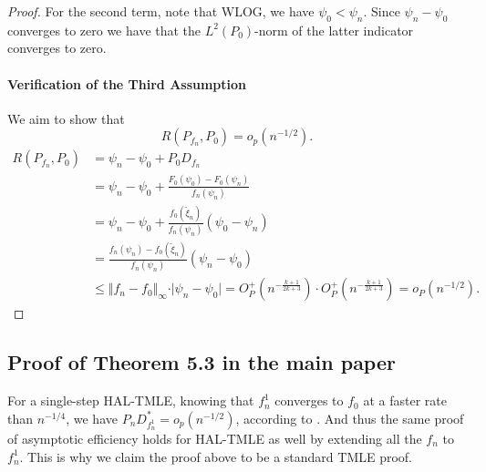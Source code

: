 \begin{proof}
For the second term, note that WLOG, we have $\psi_0 < \psi_n$. Since $\psi_n-\psi_0$ converges to zero we have that the $L^2(P_0)$-norm of the latter indicator converges to zero.

\paragraph{Verification of the Third Assumption}
We aim to show that
\[
R(P_{f_n},P_0) = o_p(n^{-1/2}).
\]
\begin{align*}
R(P_{f_n},P_0)
&= \psi_n - \psi_0 + P_0 D_{f_n} \\
&= \psi_n - \psi_0 + \frac{F_0(\psi_0) - F_0(\psi_n)}{f_n(\psi_n)} \\
&= \psi_n - \psi_0 + \frac{f_0(\tilde{\xi}_n)}{f_n(\psi_n)} (\psi_0 - \psi_n) \\
&= \frac{f_n(\psi_n) - f_0(\tilde{\xi}_n)}{f_n(\psi_n)} (\psi_n - \psi_0) \\
& \leq \Vert f_n - f_0\Vert_{\infty} \cdot \vert\psi_n - \psi_0\vert = O_P^+(n^{-\frac{k+1}{2k+3}}) \cdot O_P^+(n^{-\frac{k+1}{2k+3}}) = o_P(n^{-1/2}).
\end{align*}

\end{proof}



\subsection{Proof of Theorem 5.3 in the main paper}
For a single-step HAL-TMLE, knowing that $f_n^1$ converges to $f_0$ at a faster rate than $n^{-1/4}$, we have $P_n D^*_{f_n^1}= o_p(n^{-1/2})$, according to \citet{van2017generally}.
And thus the same proof of asymptotic efficiency holds for HAL-TMLE as well by extending all the $f_n$ to $f_n^1$. This is why we claim the proof above to be a standard TMLE proof.